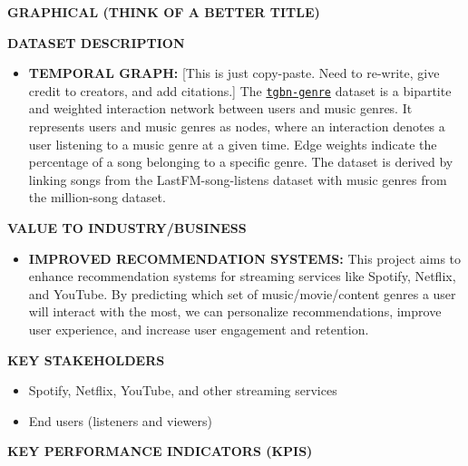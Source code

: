 \documentclass[10pt, letterpaper]{article}
\renewcommand{\title}[1]{%
	\begin{center}
		{\Large \bfseries \uppercase{#1}}
	\end{center}
}
\renewcommand{\section}[1]{%
	    \vspace{\parskip}
		{\large \bfseries\uppercase{#1}}
}
\newcommand{\itemTitle}[1]{%
	{\bfseries\uppercase{#1}}
}
\begin{document}
	
\title{Graphical (think of a better title)}
	
\section{Dataset Description}
	
\begin{itemize}
\item \itemTitle{Temporal Graph:} [This is just copy-paste. Need to 
re-write, give 
credit to creators, and add citations.] The 
\href{https://tgb.complexdatalab.com/docs/nodeprop/}{\tt{tgbn-genre}} 
dataset is a bipartite and weighted interaction network between users 
and music genres. It represents users and music genres as nodes, 
where an interaction denotes a user listening to a music genre at a 
given time. Edge weights indicate the percentage of a song belonging 
to a specific genre. The dataset is derived by linking songs from the 
LastFM-song-listens dataset with music genres from the million-song 
dataset. 
\end{itemize}
	
\section{Value to Industry/Business}

\begin{itemize}
\item \itemTitle{Improved Recommendation Systems:} This project aims 
to 
enhance recommendation systems for streaming services like Spotify, 
Netflix, and YouTube. By predicting which set of music/movie/content 
genres a user will interact with the most, we can personalize 
recommendations, improve user experience, and increase user 
engagement and retention.
\end{itemize}
	
\section{Key Stakeholders}
\begin{itemize}
\item Spotify, Netflix, YouTube, and other streaming services
\item End users (listeners and viewers)
\end{itemize}
	
\section{Key Performance Indicators (KPIs)}
\end{document}
